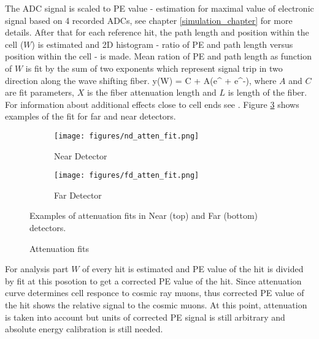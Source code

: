 The ADC signal is scaled to PE value - estimation for maximal value of electronic signal based on 4 recorded 
ADCs, see chapter \ref{simulation_chapter} for more details. After that for each reference hit, the path length 
and position within the cell ($W$) is estimated and 2D histogram - ratio of PE and path length versus position 
within the cell - is made. Mean ration of PE and path length as function of $W$ is fit by the sum of two exponents
which represent signal trip in two direction along the wave shifting fiber.
\be
y(W) = C + A\Big(e^{} + e^{-}\Big),
\ee
where $A$ and $C$ are fit parameters, $X$ is the fiber attenuation length and $L$ is length of the fiber. For
information about additional effects close to cell ends see \cite{calib_technote}. Figure \ref{fig:att_fit} shows 
examples of the fit for far and near detectors.
\begin{figure}[t!]
\begin{subfigure}[t]{0.9\textwidth}
  \centering
  \texttt{[image: figures/nd\_atten\_fit.png]}
  \caption{Near Detector}
  \label{fig:att_fit_nd}
\end{subfigure}
\vspace{0.5cm}
\newline
\begin{subfigure}[t]{0.9\textwidth}
  \centering
  \texttt{[image: figures/fd\_atten\_fit.png]}
  \caption{Far Detector}
  \label{fig:att_fitt_fd}
\end{subfigure}
\caption{Attenuation fits}
{Examples of attenuation fits in Near (top) and Far (bottom) detectors.}
\label{fig:att_fit}
\end{figure}

For analysis part $W$ of every hit is estimated and PE value of the hit is divided by fit at this posotion to 
get a corrected PE value of the hit. Since attenuation curve determines cell responce to cosmic ray muons, thus 
corrected PE value of the hit shows the relative signal to the cosmic muons. At this point, attenuation is taken
into account but units of corrected PE signal is still arbitrary and absolute energy calibration is still needed. 

